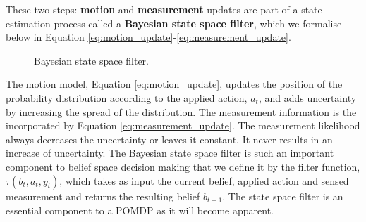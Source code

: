 These two steps: \textbf{motion}  and \textbf{measurement} updates are part of a state estimation process called a \textbf{Bayesian state space filter}, 
which we formalise below in Equation \ref{eq:motion_update}-\ref{eq:measurement_update}.
\begin{figure}
\centering
{}%
\caption{Bayesian state space filter.}
\end{figure}

The motion model, Equation \ref{eq:motion_update}, updates the position of the probability distribution according to 
the applied action, $a_t$, and adds uncertainty by increasing the spread of the distribution. The measurement information is 
the incorporated by Equation \ref{eq:measurement_update}. The measurement likelihood always decreases the uncertainty 
or leaves it constant. It never results in an increase of uncertainty. The Bayesian state space filter is such an important 
component to belief space decision making that we define it by the filter function, $\tau(b_t,a_t,y_t)$, which 
takes as input the current belief, applied action and sensed measurement and returns the resulting belief $b_{t+1}$.
The state space filter is an essential component to a POMDP as it will become apparent.

